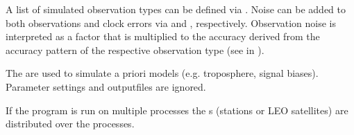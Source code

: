 A list of simulated observation types can be defined via . Noise can be added to both observations and clock errors
via  and , respectively. Observation noise is
interpreted as a factor that is multiplied to the accuracy derived from the accuracy pattern of the respective observation type
(see  in ).

The  are used to simulate a priori models (e.g. troposphere, signal biases).
Parameter settings and outputfiles are ignored.

If the program is run on multiple processes the s
(stations or LEO satellites) are distributed over the processes.


